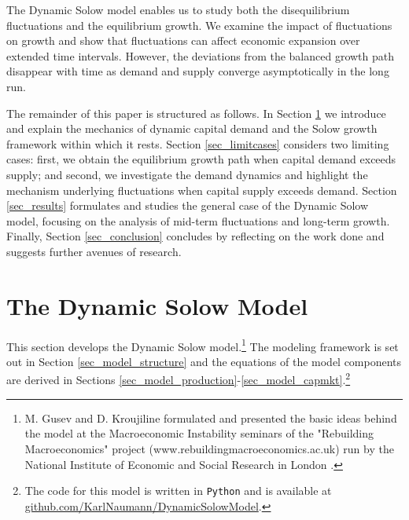 \documentclass[authoryear, review]{elsarticle}
\begin{document}
The Dynamic Solow model enables us to study both the disequilibrium fluctuations and the equilibrium growth. We examine the impact of fluctuations on growth and show that fluctuations can affect economic expansion over extended time intervals. However, the deviations from the balanced growth path disappear with time as demand and supply converge asymptotically in the long run.  

The remainder of this paper is structured as follows. In Section \ref{sec_model} we introduce and explain the mechanics of dynamic capital demand and the Solow growth framework within which it rests. Section \ref{sec_limitcases} considers two limiting cases: first, we obtain the equilibrium growth path when capital demand exceeds supply; and second, we investigate the demand dynamics and highlight the mechanism underlying fluctuations when capital supply exceeds demand. Section \ref{sec_results} formulates and studies the general case of the Dynamic Solow model, focusing on the analysis of mid-term fluctuations and long-term growth. Finally, Section \ref{sec_conclusion} concludes by reflecting on the work done and suggests further avenues of research.

\section{The Dynamic Solow Model}\label{sec_model}
This section develops the Dynamic Solow model.\footnote{M. Gusev and D. Kroujiline formulated and presented the basic ideas behind the model at the Macroeconomic Instability seminars of the "Rebuilding Macroeconomics" project (www.rebuildingmacroeconomics.ac.uk) run by the National Institute of Economic and Social Research in London \citep{GusevKroujiline2020a}.} The modeling framework is set out in Section \ref{sec_model_structure} and the equations of the model components are derived in Sections \ref{sec_model_production}-\ref{sec_model_capmkt}.\footnote{The code for this model is written in \texttt{Python} and is available at \href{https://github.com/KarlNaumann/DynamicSolowModel}{github.com/KarlNaumann/DynamicSolowModel}.}
\end{document}
